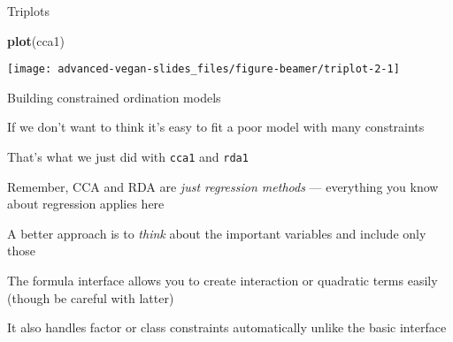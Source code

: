 \documentclass[10pt,ignorenonframetext,compress, aspectratio=169]{beamer}
\newenvironment{Shaded}{\begin{snugshade}}{\end{snugshade}}
\newcommand{\KeywordTok}[1]{\textcolor[rgb]{0.13,0.29,0.53}{\textbf{{#1}}}}
\newcommand{\NormalTok}[1]{{#1}}
\begin{document}
\begin{frame}[fragile]{Triplots}

\scriptsize

\begin{Shaded}
\begin{Highlighting}[]
\KeywordTok{plot}\NormalTok{(cca1)}
\end{Highlighting}
\end{Shaded}

\begin{center}\texttt{[image: advanced-vegan-slides\_files/figure-beamer/triplot-2-1]} \end{center}

\normalsize

\end{frame}

\begin{frame}{Building constrained ordination models}

If we don't want to think it's easy to fit a poor model with many
constraints

That's what we just did with \texttt{cca1} and \texttt{rda1}

Remember, CCA and RDA are \emph{just regression methods} --- everything
you know about regression applies here

A better approach is to \emph{think} about the important variables and
include only those

The formula interface allows you to create interaction or quadratic
terms easily (though be careful with latter)

It also handles factor or class constraints automatically unlike the
basic interface

\end{frame}
\end{document}
